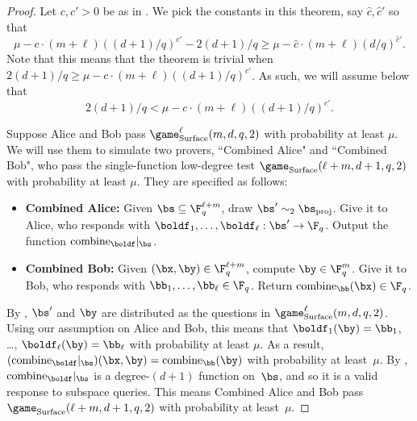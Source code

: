 \begin{proof}
Let $c, c' > 0$ be as in .
We pick the constants in this theorem, say $\hat{c}, \hat{c}'$  so that
\begin{equation*}
\mu - c \cdot (m + \ell) ((d+1)/q)^{c'} - 2(d+1)/q \geq \mu - \hat{c} \cdot (m + \ell) (d/q)^{\hat{c}'}.
\end{equation*}
Note that this means that the theorem is trivial when $2(d+1)/q \geq  \mu - c \cdot (m + \ell) ((d+1)/q)^{c'}$.
As such, we will assume below that
\begin{equation}\label{eq:really-technical}
2(d+1)/q <  \mu - c \cdot (m + \ell) ((d+1)/q)^{c'}.
\end{equation}

Suppose Alice and Bob pass $\game_{\mathrm{Surface}}^\ell(m, d, q,2)$ with probability at least $\mu$.
We will use them to simulate two provers, ``Combined Alice" and ``Combined Bob", who pass
the single-function low-degree test $\game_{\mathrm{Surface}}(\ell + m, d+1, q,2)$ with probability at least $\mu$.
They are specified as follows:
\begin{itemize}
\item[$\circ$] \textbf{Combined Alice:} Given $\bs \subseteq \F_q^{\ell + m}$, draw $\bs' \sim_2 \bs_{\mathrm{proj}}$.  Give it to Alice, who responds with $\boldf_1, \ldots, \boldf_{\ell}: \bs' \rightarrow \F_q$.  Output the function $\mathrm{combine}_{\boldf}|_{\bs}$.
\item[$\circ$] \textbf{Combined Bob:} Given $(\bx, \by) \in \F_q^{\ell + m}$, compute $\by \in \F_q^m$. Give it to Bob, who responds with $\bb_1, \ldots, \bb_\ell \in \F_q$.
			Return $\mathrm{combine}_{\bb}(\bx) \in \F_q$.
\end{itemize}
By , $\bs'$ and $\by$ are distributed as the questions in $\game_{\mathrm{Surface}}^\ell(m, d, q,2)$.
Using our assumption on Alice and Bob, this means that $\boldf_1(\by) = \bb_1$, \ldots, $\boldf_\ell(\by) = \bb_\ell$ with probability at least $\mu$.
As a result, $(\mathrm{combine}_{\boldf}|_{\bs})(\bx, \by) = \mathrm{combine}_{\bb}(\by)$ with probability at least~$\mu$.
By , $\mathrm{combine}_{\boldf}|_{\bs}$ is a degree-$(d+1)$ function on~$\bs$,
and so it is a valid response to subspace queries.
This means Combined Alice and Bob pass~$\game_{\mathrm{Surface}}(\ell + m, d+1, q,2)$ with probability at least~$\mu$.


\end{proof}

